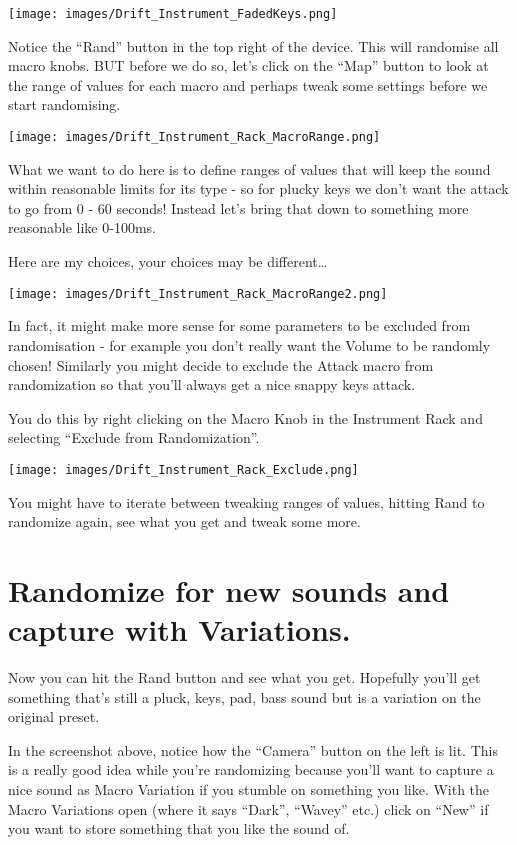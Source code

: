 \documentclass[
  12pt,
  letterpaper,
  oneside,
  open=any]{scrbook}
\begin{document}
\texttt{[image: images/Drift\_Instrument\_FadedKeys.png]}

Notice the ``Rand'' button in the top right of the device. This will
randomise all macro knobs. BUT before we do so, let's click on the
``Map'' button to look at the range of values for each macro and perhaps
tweak some settings before we start randomising.

\texttt{[image: images/Drift\_Instrument\_Rack\_MacroRange.png]}

What we want to do here is to define ranges of values that will keep the
sound within reasonable limits for its type - so for plucky keys we
don't want the attack to go from 0 - 60 seconds! Instead let's bring
that down to something more reasonable like 0-100ms.

Here are my choices, your choices may be different\ldots{}

\texttt{[image: images/Drift\_Instrument\_Rack\_MacroRange2.png]}

In fact, it might make more sense for some parameters to be excluded
from randomisation - for example you don't really want the Volume to be
randomly chosen! Similarly you might decide to exclude the Attack macro
from randomization so that you'll always get a nice snappy keys attack.

You do this by right clicking on the Macro Knob in the Instrument Rack
and selecting ``Exclude from Randomization''.

\texttt{[image: images/Drift\_Instrument\_Rack\_Exclude.png]}

You might have to iterate between tweaking ranges of values, hitting
Rand to randomize again, see what you get and tweak some more.

\section{Randomize for new sounds and capture with
Variations.}\label{randomize-for-new-sounds-and-capture-with-variations.}

Now you can hit the Rand button and see what you get. Hopefully you'll
get something that's still a pluck, keys, pad, bass sound but is a
variation on the original preset.

In the screenshot above, notice how the ``Camera'' button on the left is
lit. This is a really good idea while you're randomizing because you'll
want to capture a nice sound as Macro Variation if you stumble on
something you like. With the Macro Variations open (where it says
``Dark'', ``Wavey'' etc.) click on ``New'' if you want to store
something that you like the sound of.
\end{document}

